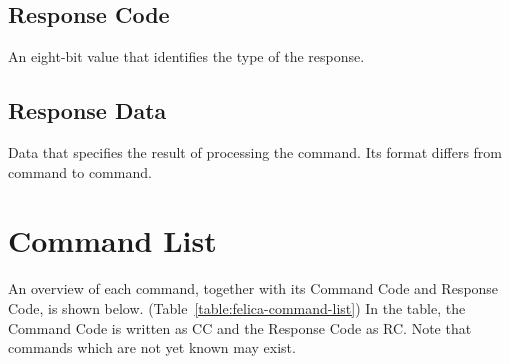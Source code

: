 \documentclass[a4paper,11pt]{report}
\begin{document}
\subsection{Response Code}

An eight-bit value that identifies the type of the response.

\subsection{Response Data}

Data that specifies the result of processing the command. Its format differs from command to command.

\section{Command List}

An overview of each command, together with its Command Code and Response Code, is shown below. (Table~\ref{table:felica-command-list}) In the table, the Command Code is written as CC and the Response Code as RC. Note that commands which are not yet known may exist.
\end{document}
